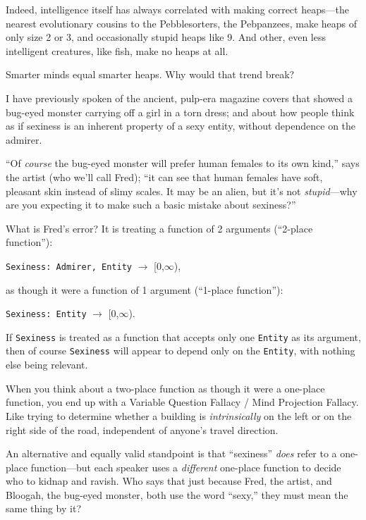 {
 Indeed, intelligence itself has always correlated with making
correct heaps---the nearest evolutionary cousins to the Pebblesorters,
the Pebpanzees, make heaps of only size 2 or 3, and occasionally stupid
heaps like 9. And other, even less intelligent creatures, like fish,
make no heaps at all.}

{
 Smarter minds equal smarter heaps. Why would that trend break?}

\myendsectiontext


{
 I have previously spoken of the ancient, pulp-era magazine covers
that showed a bug-eyed monster carrying off a girl in a torn dress; and
about how people think as if sexiness is an inherent property of a sexy
entity, without dependence on the admirer. }

{
 ``Of \textit{course} the bug-eyed monster will
prefer human females to its own kind,'' says the
artist (who we'll call Fred); ``it can
see that human females have soft, pleasant skin instead of slimy
scales. It may be an alien, but it's not
\textit{stupid}{}---why are you expecting it to make such a basic
mistake about sexiness?''}

{
 What is Fred's error? It is treating a function of
2 arguments (``2-place function''):}

\begin{center}
 \texttt{Sexiness: Admirer, Entity} $\rightarrow $ [0,${\infty}$),
\end{center}


{
 as though it were a function of 1 argument
(``1-place function''):}

\begin{center}
 \texttt{Sexiness: Entity} $\rightarrow $ [0,${\infty}$).
\end{center}


{
 If \texttt{Sexiness} is treated as a function that accepts only one \texttt{Entity}
as its argument, then of course \texttt{Sexiness} will appear to depend only on
the \texttt{Entity}, with nothing else being relevant.}

{
 When you think about a two-place function as though it were a
one-place function, you end up with a Variable Question Fallacy / Mind
Projection Fallacy. Like trying to determine whether a building is
\textit{intrinsically} on the left or on the right side of the road,
independent of anyone's travel direction.}

{
 An alternative and equally valid standpoint is that
``sexiness'' \textit{does} refer to
a one-place function---but each speaker uses a \textit{different}
one-place function to decide who to kidnap and ravish. Who says that
just because Fred, the artist, and Bloogah, the bug-eyed monster, both
use the word ``sexy,'' they must
mean the same thing by it?}

